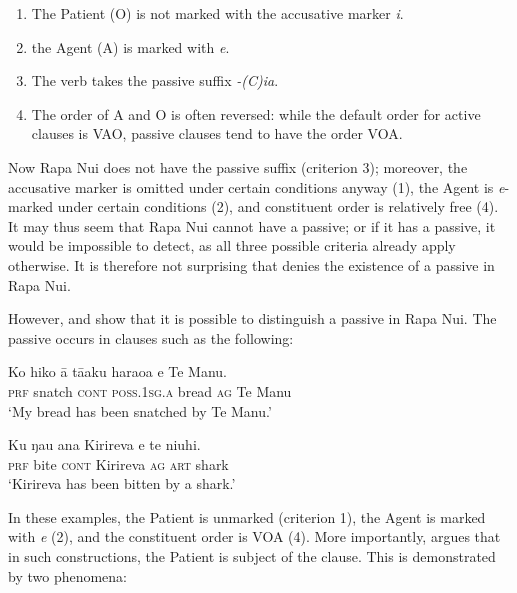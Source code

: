 \begin{enumerate}
\item 
The Patient (O) is not marked with the accusative marker \textit{i}.

\item 
the Agent (A) is marked with \textit{e}.

\item 
The verb takes the passive suffix \textit{-(C)ia}.

\item 
The order of A and O is often reversed: while the default order for active clauses is VAO, passive clauses tend to have the order VOA.

\end{enumerate}

Now Rapa Nui does not have the passive suffix (criterion 3); moreover, the accusative marker is omitted under certain conditions anyway (1), the Agent is \textit{e}-marked under certain conditions (2), and constituent order is relatively free (4). It may thus seem that Rapa Nui cannot have a passive; or if it has a passive, it would be impossible to detect, as all three possible criteria already apply otherwise. It is therefore not surprising that \citet[167]{Chapin1978} denies the existence of a passive in Rapa Nui.

However, \citet{Alexander1981OL} and \citet{WeberN2003} show that it is possible to distinguish a passive in Rapa Nui. The passive occurs in clauses such as the following:

\ea\label{ex:8.46}
\gll Ko hiko {\ꞌ}ā tā{\ꞌ}aku haraoa e Te Manu.\\
\textsc{prf} snatch \textsc{cont} \textsc{poss.1sg.a} bread \textsc{ag} Te Manu\\

\glt 
‘My bread has been snatched by Te Manu.’ \textstyleExampleref{[R245.039]} 
\z

\ea\label{ex:8.47}
\gll Ku ŋau {\ꞌ}ana Kirireva e te niuhi.\\
\textsc{prf} bite \textsc{cont} Kirireva \textsc{ag} \textsc{art} shark\\

\glt
‘Kirireva has been bitten by a shark.’ \textstyleExampleref{[R361.065]} 
\z

In these examples, the Patient is unmarked (criterion 1), the Agent is marked with \textit{e} (2), and the constituent order is VOA (4). More importantly, \citet[56–58]{WeberN2003} argues that in such constructions, the Patient is subject of the clause. This is demonstrated by two phenomena:

